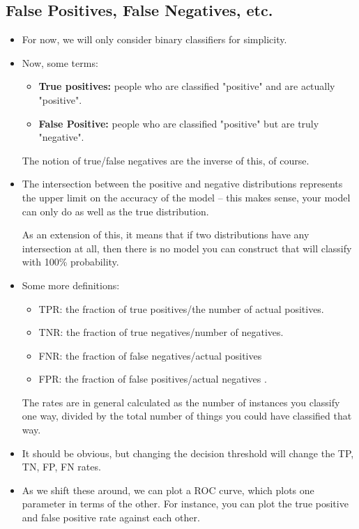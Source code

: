 \subsection{False Positives, False Negatives, etc.}
\begin{itemize}
	\item For now, we will only consider binary classifiers for simplicity.
	\item Now, some terms:
		\begin{itemize}
			\item \textbf{True positives:} people who are classified "positive" and
				are actually "positive". 
			\item \textbf{False Positive:} people who are classified "positive" but
				are truly "negative".
		\end{itemize}

		The notion of true/false negatives are the inverse of this, of course. 
	\item The intersection between the positive and negative distributions represents
		the upper limit on the accuracy of the model -- this makes sense, your model
		can only do as well as the true distribution.

		As an extension of this, it means that if two distributions have any
		intersection at all, then there is no model you can construct that will
		classify with 100\% probability.  
	\item Some more definitions:
		\begin{itemize}
			\item TPR: the fraction of true positives/the number of actual positives.
			\item TNR: the fraction of true negatives/number of negatives. 
			\item FNR: the fraction of false negatives/actual positives
			\item FPR: the fraction of false positives/actual negatives .
		\end{itemize}
		The rates are in general calculated as the number of instances you classify
		one way, divided by the total number of things you could have classified that
		way. 
	\item It should be obvious, but changing the decision threshold will change the
		TP, TN, FP, FN rates. 
	\item As we shift these around, we can plot a ROC curve, which plots one
		parameter in terms of the other. For instance, you can plot the true positive
		and false positive rate against each other. 


\end{itemize}
